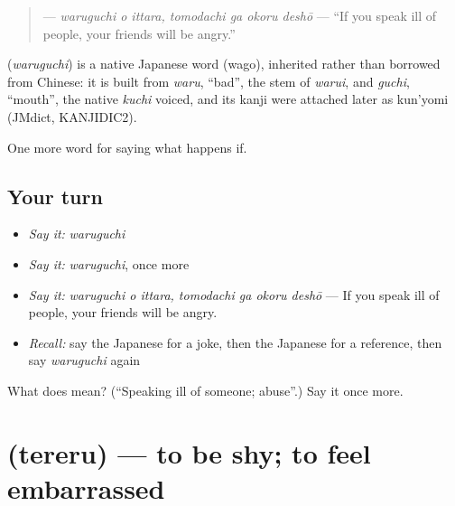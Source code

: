 \begin{quote}
\textbf{  } — \emph{waruguchi o ittara, tomodachi ga okoru deshō} — \textquotedblleft{}If you speak ill of people, your friends will be angry.\textquotedblright{}
\end{quote}

\begin{cousinweb}
\textbf{} (\emph{waruguchi}) is a native Japanese word (wago), inherited rather than borrowed from Chinese: it is built from \emph{waru}, \textquotedblleft{}bad\textquotedblright{}, the stem of \emph{warui}, and \emph{guchi}, \textquotedblleft{}mouth\textquotedblright{}, the native \emph{kuchi} voiced, and its kanji were attached later as kun'yomi (JMdict, KANJIDIC2).
\end{cousinweb}

\begin{grammarlens}[title={What you've built}]
One more word for saying what happens if.
\end{grammarlens}

\subsection*{Your turn}
\begin{itemize}
\raggedright
  \item \emph{Say it:} \emph{waruguchi}
  \item \emph{Say it:} \emph{waruguchi}, once more
  \item \emph{Say it:} \emph{waruguchi o ittara, tomodachi ga okoru deshō} — If you speak ill of people, your friends will be angry.
  \item \emph{Recall:} say the Japanese for a joke, then the Japanese for a reference, then say \emph{waruguchi} again
\end{itemize}

\begin{tcolorbox}[breakable,colback=teal!4,colframe=teal!35!black,title={Before you move on}]
What does  mean? (\textquotedblleft{}Speaking ill of someone; abuse\textquotedblright{}.) Say it once more.
\end{tcolorbox}
\section[\texorpdfstring{\ja{てれる} (tereru)}{てれる (tereru)}]{ (tereru) — to be shy; to feel embarrassed}

